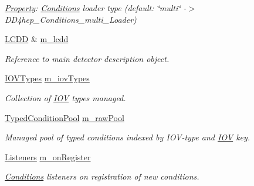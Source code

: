\begin{DoxyCompactItemize}
\begin{DoxyCompactList}\small\item\em \hyperlink{class_d_d4hep_1_1_property}{Property}\+: \hyperlink{namespace_d_d4hep_1_1_conditions}{Conditions} loader type (default\+: \char`\"{}multi\char`\"{} -\/$>$ D\+D4hep\+\_\+\+Conditions\+\_\+multi\+\_\+\+Loader) \end{DoxyCompactList}\item 
\hyperlink{class_d_d4hep_1_1_geometry_1_1_l_c_d_d}{L\+C\+DD} \& \hyperlink{class_d_d4hep_1_1_conditions_1_1_conditions_manager_object_a6ca16a780558379464d37ca9e691e9ef}{m\+\_\+lcdd}
\begin{DoxyCompactList}\small\item\em Reference to main detector description object. \end{DoxyCompactList}\item 
\hyperlink{class_d_d4hep_1_1_conditions_1_1_conditions_manager_object_a8c3b7d5bdfb7fc6bf6e61ddba5a5f652}{I\+O\+V\+Types} \hyperlink{class_d_d4hep_1_1_conditions_1_1_conditions_manager_object_abc6f28abb03bdfa1f3c0d51de6e6ac9d}{m\+\_\+iov\+Types}
\begin{DoxyCompactList}\small\item\em Collection of \hyperlink{class_d_d4hep_1_1_i_o_v}{I\+OV} types managed. \end{DoxyCompactList}\item 
\hyperlink{class_d_d4hep_1_1_conditions_1_1_conditions_manager_object_a1617c134372fbb79d06990707f19bb0c}{Typed\+Condition\+Pool} \hyperlink{class_d_d4hep_1_1_conditions_1_1_conditions_manager_object_a90c9b5060b3a6299aa7d5d4e9a0d8105}{m\+\_\+raw\+Pool}
\begin{DoxyCompactList}\small\item\em Managed pool of typed conditions indexed by I\+O\+V-\/type and \hyperlink{class_d_d4hep_1_1_i_o_v}{I\+OV} key. \end{DoxyCompactList}\item 
\hyperlink{class_d_d4hep_1_1_conditions_1_1_conditions_manager_object_aba0162524bc90a39e30bd5f1f0067ee2}{Listeners} \hyperlink{class_d_d4hep_1_1_conditions_1_1_conditions_manager_object_a28a1e3f34a87dcd305b0f71bb92f297f}{m\+\_\+on\+Register}
\begin{DoxyCompactList}\small\item\em \hyperlink{namespace_d_d4hep_1_1_conditions}{Conditions} listeners on registration of new conditions. \end{DoxyCompactList}\item 

\end{DoxyCompactItemize}
